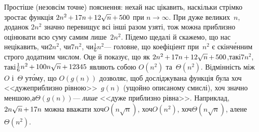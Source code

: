 Простіше (не\nolinebreak[2] зовсім точне) пояснення: нехай нас цікавить, наскільки стрімко зростає функція $2n^2\dib{{+}}17n\dib{{+}}12\sqrt{n}\dib{{+}}500$ при $n{\to}\infty$. При дуже великих~$n$, доданок $2n^2$ значно перевищує всі інші разом узяті, тож можна приблизно оцінювати всю суму самим лише~$2n^2$. Підемо ще\nolinebreak[2] далі й скажемо, що нас не\nolinebreak[3] цікавить, 
чи\nolinebreak[3] $2n^2$,
чи\nolinebreak[3] $7n^2$,
чи\nolinebreak[3] $\frac{1}{6}n^2$\nolinebreak[3] --- головне, що коефіціент при~$n^2$ є скінч\'{е}нним строго додатним числом. Оце й показує, що як $2n^2\dib{{+}}17n\dib{{+}}12\sqrt{n}\dib{{+}}500$,\linebreak[1]
так\nolinebreak[2] і\nolinebreak[1] $7n^2$,
так\nolinebreak[2] і\nolinebreak[1] $\frac{1}{6}n^2\dib{{+}}100n\sqrt{n}\dib{{+}}12345$
являють собою $O(n^2)$ та~$\Theta(n^2)$.
Відмінність між $O$ і~$\Theta$ у\nolinebreak[3] т\'{о}му, що $O(g(n))$ дозволяє, щоб досліджувана функція була хоч <<дуже\nolinebreak[2] приблизно рівною>>~$g(n)$ (у\nolinebreak[3] щойно описаному смислі), хоч значно меншою,\linebreak[1] а\nolinebreak[1] $\Theta(g(n))$\nolinebreak[3] --- \emph{лише} <<дуже приблизно рівна>>. Наприклад, $2n\sqrt{n}\dib{{+}}17n$ можна вважати хоч\nolinebreak[2] ${O(n\sqrt{n})}$, хоч\nolinebreak[2] ${O(n^2)}$, хоч\nolinebreak[2] ${\Theta(n\sqrt{n})}$, але\nolinebreak[2] не\nolinebreak[2] ${\Theta(n^2)}$.

